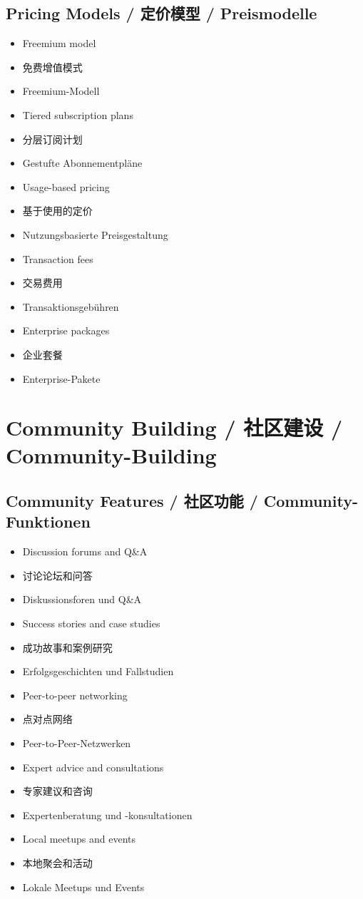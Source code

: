 \subsection{Pricing Models / 定价模型 / Preismodelle}
\begin{itemize}
    \item Freemium model
    \item 免费增值模式
    \item Freemium-Modell
    \item Tiered subscription plans
    \item 分层订阅计划
    \item Gestufte Abonnementpläne
    \item Usage-based pricing
    \item 基于使用的定价
    \item Nutzungsbasierte Preisgestaltung
    \item Transaction fees
    \item 交易费用
    \item Transaktionsgebühren
    \item Enterprise packages
    \item 企业套餐
    \item Enterprise-Pakete
\end{itemize}

\section{Community Building / 社区建设 / Community-Building}

\subsection{Community Features / 社区功能 / Community-Funktionen}
\begin{itemize}
    \item Discussion forums and Q\&A
    \item 讨论论坛和问答
    \item Diskussionsforen und Q\&A
    \item Success stories and case studies
    \item 成功故事和案例研究
    \item Erfolgsgeschichten und Fallstudien
    \item Peer-to-peer networking
    \item 点对点网络
    \item Peer-to-Peer-Netzwerken
    \item Expert advice and consultations
    \item 专家建议和咨询
    \item Expertenberatung und -konsultationen
    \item Local meetups and events
    \item 本地聚会和活动
    \item Lokale Meetups und Events
\end{itemize}

